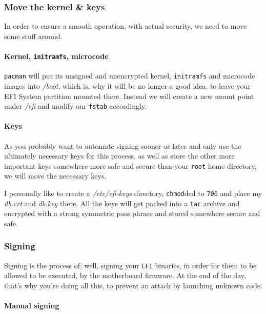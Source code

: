 \documentclass[10pt]{dustdoc}
\begin{document}
\subsubsection{Move the kernel \& keys}
\label{sec:move-the-kernel-and-keys}

In order to ensure a smooth operation, with actual security, we need to move some stuff around.

\paragraph{Kernel, \texttt{initramfs}, microcode}
\label{par:kernel-initramfs-microcode}

\texttt{pacman} will put its unsigned and unencrypted kernel, \texttt{initramfs} and microcode images into \textit{/boot}, which is, why it will be no longer a good idea, to leave your EFI System partition mounted there.
Instead we will create a new mount point under \textit{/efi} and modify our \texttt{fstab} accordingly.

\paragraph{Keys}
\label{par:keys}

As you probably want to automate signing sooner or later and only use the ultimately necessary keys for this process, as well as store the other more important keys somewhere more safe and secure than your \texttt{root} home directory, we will move the necessary keys.

I personally like to create a \textit{/etc/efi-keys} directory, \texttt{chmod}ded to \texttt{700} and place my \textit{db.crt} and \textit{db.key} there.
All the keys will get packed into a \texttt{tar} archive and encrypted with a strong symmetric pass phrase and stored somewhere secure and safe.

\subsubsection{Signing}
\label{sec:signing}

Signing is the process of, well, signing your \texttt{EFI} binaries, in order for them to be allowed to be executed, by the motherboard firmware.
At the end of the day, that’s why you’re doing all this, to prevent an attack by launching unknown code.

\paragraph{Manual signing}
\label{par:manual-signing}
\end{document}
